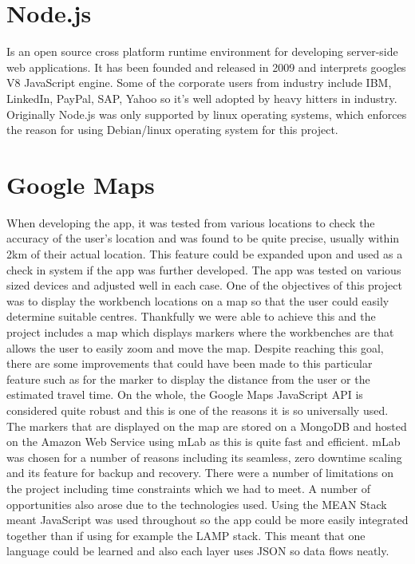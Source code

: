 \begin{itemize}
\section{Node.js}
Is an open source cross platform runtime environment for developing server-side web applications. It has been founded and released in 2009 and interprets googles V8 JavaScript engine. Some of the corporate users from industry include IBM, LinkedIn, PayPal, SAP, Yahoo so it’s well adopted by heavy hitters in industry. Originally Node.js was only supported by linux operating systems, which enforces the reason for using Debian/linux operating system for this project.

\section{Google Maps}

When developing the app, it was tested from various locations to check the accuracy of the user’s location and was found to be quite precise, usually within 2km of their actual location. This feature could be expanded upon and used as a check in system if the app was further developed. The app was tested on various sized devices and adjusted well in each case.
One of the objectives of this project was to display the workbench locations on a map so that the user could easily determine suitable centres. Thankfully we were able to achieve this and the project includes a map which displays markers where the workbenches are that allows the user to easily zoom and move the map. Despite reaching this goal, there are some improvements that could have been made to this particular feature such as for the marker to display the distance from the user or the estimated travel time.
On the whole, the Google Maps JavaScript API is considered quite robust and this is one of the reasons it is so universally used. The markers that are displayed on the map are stored on a MongoDB and hosted on the Amazon Web Service using mLab as this is quite fast and efficient. mLab was chosen for a number of reasons including its seamless, zero downtime scaling and its feature for backup and recovery.
There were a number of limitations on the project including time constraints which we had to meet. 
A number of opportunities also arose due to the technologies used. Using the MEAN Stack meant JavaScript was used throughout so the app could be more easily integrated together than if using for example the LAMP stack. This meant that one language could be learned and also each layer uses JSON so data flows neatly. 




\end{itemize}
